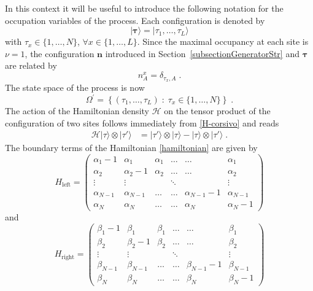 \documentclass[10pt]{article}
\numberwithin{equation}{section}
\numberwithin{equation}{subsection}
\newcommand{\dt}{\;.}
\begin{document}
 In this context it will be useful to introduce the following notation for the occupation variables of the process. Each configuration is denoted by
\begin{equation}\label{Tau-Notation}
	|\bm{\tau}\rangle=|\tau_{1},\ldots,\tau_{L}\rangle
\end{equation} 
with $\tau_{x}\in \{1,\ldots,N\}$, $\forall x\in \{1,\ldots,L\}$. Since the {maximal occupancy at each site is $\nu=1$},
the configuration $\bm{n}$ introduced in Section~\ref{subsectionGeneratorStr} and $\bm{\tau}$ are related by 
\begin{equation}\label{notation-change-relation}
	n_{A}^{x}=\delta_{\tau_{x},A}\dt
\end{equation}
The state space of the process is now 
\begin{equation}
	\Omega^{'}=\left\{(\tau_{1},\ldots,\tau_{L})\;:\; \tau_{x}\in\{1,\ldots,N\}\right\}\dt
\end{equation}
The action of the Hamiltonian density $\mathcal{H}$ on the tensor product of the configuration of two sites follows immediately from \eqref{H-corsivo} and reads
\begin{equation}
	\begin{split}
		\mathcal{H}| \tau\rangle\otimes   |\tau'\rangle&=|\tau'\rangle \otimes |\tau\rangle-|\tau\rangle \otimes|\tau'\rangle\dt
	\end{split}
\end{equation}
The boundary terms of the Hamiltonian \eqref{hamiltonian}  are given by 
\begin{equation}
	H_{\text{left}}=\begin{pmatrix}
		\alpha_{1}-1&\alpha_{1}&\alpha_{1}&\ldots&\ldots&\alpha_{1}\\
		\alpha_{2}&\alpha_{2}-1&\alpha_{2}&\ldots&\ldots&\alpha_{2}\\
		\vdots&\vdots& &\ddots& &\vdots\\
		\alpha_{N-1}&\alpha_{N-1}&\ldots&\ldots&\alpha_{N-1}-1&\alpha_{N-1}\\
		\alpha_{N}&\alpha_{N}&\ldots&\ldots&\alpha_{N}&\alpha_{N}-1
	\end{pmatrix}
\end{equation}
and 
\begin{equation}
	H_{\text{right}}=\begin{pmatrix}
		\beta_{1}-1&\beta_{1}&\beta_{1}&\ldots&\ldots&\beta_{1}\\
		\beta_{2}&\beta_{2}-1&\beta_{2}&\ldots&\ldots&\beta_{2}\\
		\vdots&\vdots& &\ddots& &\vdots\\
		\beta_{N-1}&\beta_{N-1}&\ldots&\ldots&\beta_{N-1}-1&\beta_{N-1}\\
		\beta_{N}&\beta_{N}&\ldots&\ldots&\beta_{N}&\beta_{N}-1
	\end{pmatrix}
\end{equation}
\end{document}
